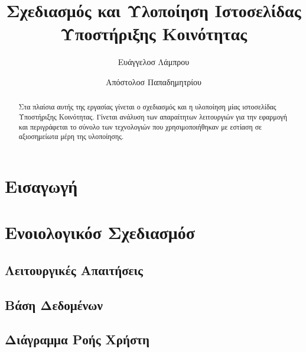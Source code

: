 \documentclass[acmtog, nonacm, language=english, language=greek]{acmart}
\begin{document}
\title{Σχεδιασμός και Υλοποίηση Ιστοσελίδας Υποστήριξης Κοινότητας}

\author{Ευάγγελοσ Λάμπρου}
\orcid{}

\author{Απόστολοσ Παπαδημητρίου}

\begin{abstract}
    Στα πλαίσια αυτής της εργασίας γίνεται ο σχεδιασμός και η υλοποίηση μίας 
    ιστοσελίδας Υποστήριξης Κοινότητας. Γίνεται ανάλυση των απαραίτητων 
    λειτουργιών για την εφαρμογή και περιγράφεται το σύνολο των τεχνολογιών 
    που χρησιμοποιήθηκαν με εστίαση σε αξιοσημείωτα μέρη της υλοποίησης.
\end{abstract}

\maketitle

\section{Εισαγωγή}

\section{Ενοιολογικόσ Σχεδιασμόσ}

\subsection{Λειτουργικές Απαιτήσεις}

\subsection{Βάση Δεδομένων}
\subsection{Διάγραμμα Ροής Χρήστη}
\end{document}
